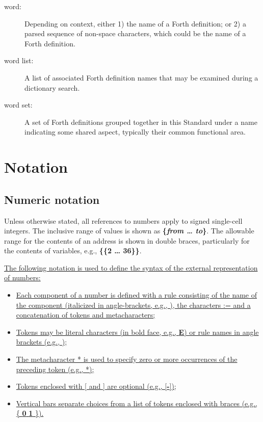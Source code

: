 \begin{description}
\item[word:]
	Depending on context, either
	1) the name of a Forth definition; or
	2) a parsed sequence of non-space characters,
	which could be the name of a Forth definition.

\item[word list:]
	A list of associated Forth definition names that may be examined
	during a dictionary search.

\item[word set:]
	A set of Forth definitions grouped together in this Standard
	under a name indicating some shared aspect, typically their
	common functional area.
\end{description}

\section{Notation} %

\subsection{Numeric notation}
\label{notation:numeric}

Unless otherwise stated, all references to numbers apply to signed
single-cell integers. The inclusive range of values is shown as
\textbf{\{\textit{from {\ldots} to}\}}. The allowable range for the
contents of an address is shown in double braces, particularly for
the contents of variables,
e.g.,  \textbf{\{\{2 {\ldots} 36\}\}}.

\cbstart
\uline{The following notation is used to define the syntax of the external
representation of numbers:}

\begin{itemize}
\item \uline{Each component of a number is defined with a rule consisting
of the name of the component (italicized in angle-brackets,
e.g., ), the characters \textsf{:=} and a concatenation
of tokens and metacharacters;}

\item \uline{Tokens may be literal characters (in bold face, e.g.,
\textbf{E}) or rule names in angle brackets (e.g., );}

\item \uline{The metacharacter * is used to specify zero or more occurrences of
the preceding token (e.g., *);}

\item \uline{Tokens enclosed with [ and ] are optional (e.g., [\textbf{-}]);}

\item \uline{Vertical bars separate choices from a list of tokens enclosed
with braces (e.g., \{ \textbf{0} {\textbar} \textbf{1} \}).}
\end{itemize}
\cbend

